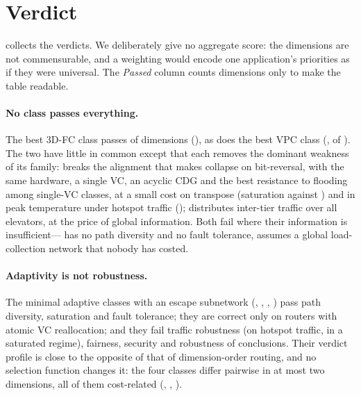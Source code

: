 \section{Verdict}
\label{sec:verdict}

 collects the verdicts. We deliberately give no aggregate score: the dimensions are not commensurable, and a weighting would encode one application's priorities as if they were universal. The \emph{Passed} column counts dimensions only to make the table readable.

\begin{table}[tbp]
\centering
\caption{Verdict per class and dimension. \cmark{} pass; \xmark{} fail; \pmark{} partial; \xmark$^{\ddagger}$ fail because the class deadlocked in the runs of the dimension; \xmark$^{\S}$ fail of  only because the class deadlocked under non-atomic VC reallocation (deadlock-free under atomic reallocation); ref: reference class of the family; --: not evaluated.  is descriptive and omitted.}
\label{tab:verdict}
\small
\setlength{\tabcolsep}{4pt}

\end{table}

\paragraph{No class passes everything.} The best 3D-FC class passes  of  dimensions (), as does the best VPC class (,  of ). The two have little in common except that each removes the dominant weakness of its family:  breaks the alignment that makes  collapse on bit-reversal, with the same hardware, a single VC, an acyclic CDG and the best resistance to flooding among single-VC classes, at a small cost on transpose (saturation  against ) and in peak temperature under hotspot traffic ();  distributes inter-tier traffic over all elevators, at the price of global information. Both fail where their information is insufficient--- has no path diversity and no fault tolerance,  assumes a global load-collection network that nobody has costed.

\paragraph{Adaptivity is not robustness.} The minimal adaptive classes with an escape subnetwork (, , , ) pass path diversity, saturation and fault tolerance; they are correct only on routers with atomic VC reallocation; and they fail traffic robustness (on hotspot traffic, in a saturated regime), fairness, security and robustness of conclusions. Their verdict profile is close to the opposite of that of dimension-order routing, and no selection function changes it: the four classes differ pairwise in at most two dimensions, all of them cost-related (, , ).

